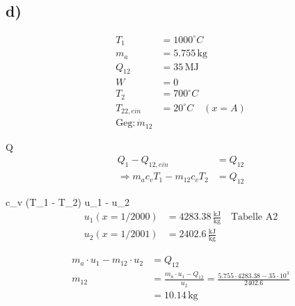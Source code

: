 

\subsection*{d)}
\begin{align*}
    T_1 &= 1000^\circ C \\
    m_a &= 5.755 \, \text{kg} \\
    Q_{12} &= 35 \, \text{MJ} \\
    W &= 0 \\
    T_2 &= 700^\circ C \\
    T_{22,ein} &= 20^\circ C \quad (x = A) \\
    \text{Geg:} \, \dot{m}_{12}
\end{align*}

 Q
\begin{align*}
    Q_1 - Q_{12,ein} &= Q_{12} \\
    \Rightarrow m_a c_v T_1 - m_{12} c_v T_2 &= Q_{12}
\end{align*}

 c_v (T_1 - T_2)  \Rightarrow u_1 - u_2
\begin{align*}
    u_1 (x = 1/2000) &= 4283.38 \, \frac{\text{kJ}}{\text{kg}} \quad \text{Tabelle A2} \\
    u_2 (x = 1/2001) &= 2402.6 \, \frac{\text{kJ}}{\text{kg}}
\end{align*}

\begin{align*}
    m_a \cdot u_1 - m_{12} \cdot u_2 &= Q_{12} \\
    m_{12} &= \frac{m_a \cdot u_1 - Q_{12}}{u_2} = \frac{5.755 \cdot 4283.38 - 35 \cdot 10^3}{2402.6} \\
    &= 10.14 \, \text{kg}
\end{align*}